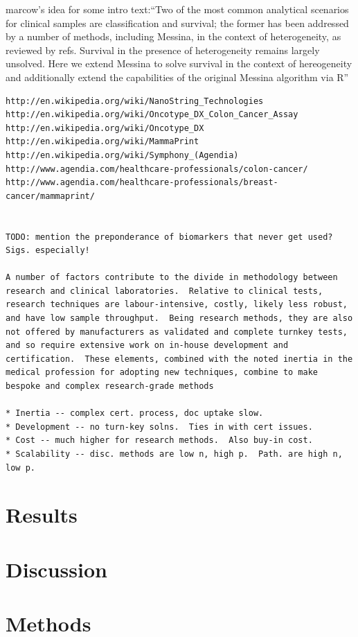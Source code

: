\documentclass[dissertation.tex]{subfiles}
\begin{document}
marcow’s idea for some intro text:``Two of the most common analytical scenarios for clinical samples are classification and survival; the former has been addressed by a number of methods, including Messina, in the context of heterogeneity, as reviewed by refs. Survival in the presence of heterogeneity remains largely unsolved. Here we extend Messina to solve
survival in the context of hereogeneity and additionally extend the capabilities of the original Messina algorithm via R''

\begin{verbatim}
http://en.wikipedia.org/wiki/NanoString_Technologies
http://en.wikipedia.org/wiki/Oncotype_DX_Colon_Cancer_Assay
http://en.wikipedia.org/wiki/Oncotype_DX
http://en.wikipedia.org/wiki/MammaPrint
http://en.wikipedia.org/wiki/Symphony_(Agendia)
http://www.agendia.com/healthcare-professionals/colon-cancer/
http://www.agendia.com/healthcare-professionals/breast-cancer/mammaprint/


TODO: mention the preponderance of biomarkers that never get used?  Sigs. especially!

A number of factors contribute to the divide in methodology between research and clinical laboratories.  Relative to clinical tests, research techniques are labour-intensive, costly, likely less robust, and have low sample throughput.  Being research methods, they are also not offered by manufacturers as validated and complete turnkey tests, and so require extensive work on in-house development and certification.  These elements, combined with the noted inertia in the medical profession for adopting new techniques, combine to make bespoke and complex research-grade methods 

* Inertia -- complex cert. process, doc uptake slow.
* Development -- no turn-key solns.  Ties in with cert issues.
* Cost -- much higher for research methods.  Also buy-in cost.
* Scalability -- disc. methods are low n, high p.  Path. are high n, low p.
\end{verbatim}


\section{Results}

\section{Discussion}

\section{Methods}
\end{document}

